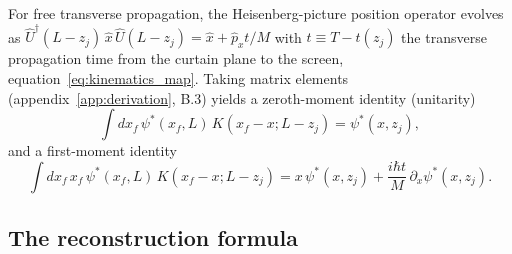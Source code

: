 \documentclass[11pt,a4paper]{article}
\begin{document}
For free transverse propagation, the Heisenberg-picture position operator evolves as $\hat{U}^\dagger(L-z_j)\,\hat{x}\,\hat{U}(L-z_j) = \hat{x} + \hat{p}_x t/M$ with $t \equiv T - t(z_j)$ the transverse propagation time from the curtain plane to the screen, equation~\eqref{eq:kinematics_map}. Taking matrix elements (appendix~\ref{app:derivation}, B.3) yields a zeroth-moment identity (unitarity)
\begin{equation}
\int dx_f\,\psi^*(x_f, L)\,K(x_f - x; L - z_j) = \psi^*(x, z_j),
\label{eq:Heisenberg_0}
\end{equation}
and a first-moment identity
\begin{equation}
\int dx_f\,x_f\,\psi^*(x_f, L)\,K(x_f - x; L - z_j) = x\,\psi^*(x, z_j) + \frac{i\hbar t}{M}\,\partial_x\psi^*(x, z_j).
\label{eq:Heisenberg_x}
\end{equation}

\subsection{The reconstruction formula}
\label{sec:reconstruction_formula}
\end{document}

